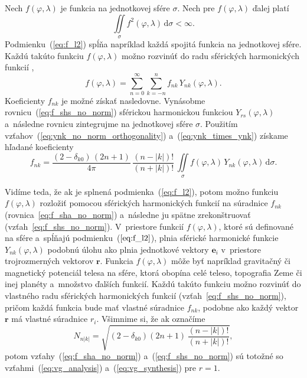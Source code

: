 \documentclass[a4paper,12pt]{book}
\newcommand{\diff}{\mathrm d}
\let\vec\mathbf
\begin{document}
Nech $f(\varphi, \lambda)$ je funkcia na jednotkovej sfére $\sigma$.  Nech pre
$f(\varphi, \lambda)$ ďalej platí
%
\begin{equation}
\label{eq:f_l2}
\iint\limits_\sigma f^2(\varphi, \lambda) \, \diff \sigma < \infty{.}
\end{equation}
%
Podmienku~(\ref{eq:f_l2}) spĺňa napríklad každá spojitá funkcia na jednotkovej
sfére.  Každú takúto funkciu $f(\varphi, \lambda)$ možno rozvinúť do radu
sférických harmonických funkcií \parencite[napríklad][]{MoritzPhysicalGeodesy},
%
\begin{equation}
\label{eq:f_shs_no_norm}
f(\varphi, \lambda) = \sum_{n = 0}^\infty \sum_{k = -n}^n f_{nk} \,
Y_{nk}(\varphi, \lambda){.}
\end{equation}
%
Koeficienty $f_{nk}$ je možné získať nasledovne.  Vynásobme 
rovnicu~(\ref{eq:f_shs_no_norm}) sférickou harmonickou funkciou 
$Y_{rs}(\varphi, \lambda)$ a~následne rovnicu zintegrujme na jednotkovej sfére 
$\sigma$.  Použitím vzťahov~(\ref{eq:ynk_no_norm_orthogonality}) 
a~(\ref{eq:ynk_times_ynk}) získame hľadané koeficienty
%
\begin{equation}
\label{eq:f_sha_no_norm}
f_{nk} = \frac{(2 - \delta_{k0}) \, (2n + 1)}{4\pi} \, \frac{(n - |k|)!}{(n 
+ |k|)!} \, \iint\limits_{\sigma} f(\varphi, \lambda) \, Y_{nk}(\varphi, 
\lambda) \, \diff \sigma{.}
\end{equation}

Vidíme teda, že ak je splnená podmienka~(\ref{eq:f_l2}), potom možno 
funkciu~$f(\varphi, \lambda)$ rozložiť pomocou sférických harmonických funkcií 
na súradnice $f_{nk}$ (rovnica~\ref{eq:f_sha_no_norm}) a~následne ju spätne 
zrekonštruovať (vzťah~\ref{eq:f_shs_no_norm}).  V~priestore funkcií $f(\varphi, 
\lambda)$, ktoré sú definované na sfére a~spĺňajú podmienku~($\ref{eq:f_l2}$), 
plnia sférické harmonické funkcie $Y_{nk}(\varphi, \lambda)$ podobnú úlohu ako 
plnia jednotkové vektory $\vec e_i$ v~priestore trojrozmerných vektorov $\vec 
r$.  Funkcia $f(\varphi,\lambda)$ môže byť napríklad gravitačný či magnetický 
potenciál telesa na sfére, ktorá obopína celé teleso, topografia Zeme či inej 
planéty a~množstvo ďalších funkcií.  Každú takúto funkciu možno rozvinúť do 
vlastného radu sférických harmonických funkcií (vzťah~\ref{eq:f_shs_no_norm}), 
pričom každá funkcia bude mať vlastné súradnice $f_{nk}$, podobne ako každý 
vektor $\vec r$ má vlastné súradnice $r_i$.  Všimnime si, že ak označíme
%
\begin{equation}
\label{eq:sh_norm}
N_{n|k|} = \sqrt{(2 - \delta_{k0}) (2n + 1) \, \frac{(n - |k|)!}{(n
+ |k|)!}}{,}
\end{equation}
%
potom vzťahy~(\ref{eq:f_sha_no_norm}) a~(\ref{eq:f_shs_no_norm}) sú totožné so
vzťahmi~(\ref{eq:vg_analysis}) a~(\ref{eq:vg_synthesis}) pre $r = 1$.
\end{document}
